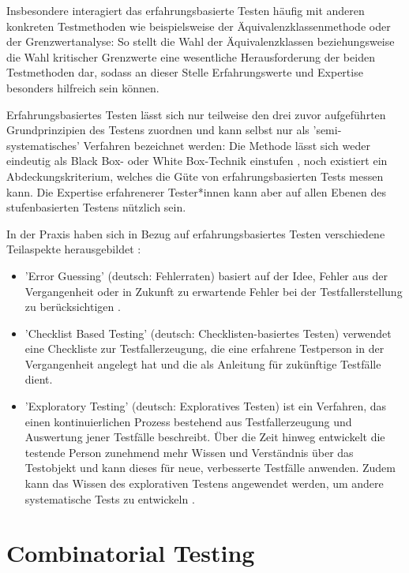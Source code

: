 Insbesondere interagiert das erfahrungsbasierte Testen häufig mit anderen konkreten Testmethoden wie beispielsweise der Äquivalenzklassenmethode oder der Grenzwertanalyse: So stellt die Wahl der Äquivalenzklassen beziehungsweise die Wahl kritischer Grenzwerte eine wesentliche Herausforderung der beiden Testmethoden dar, sodass an dieser Stelle Erfahrungswerte und Expertise besonders hilfreich sein können.

Erfahrungsbasiertes Testen lässt sich nur teilweise den drei zuvor aufgeführten Grundprinzipien des Testens zuordnen und kann selbst nur als 'semi-systematisches' Verfahren bezeichnet werden: Die Methode lässt sich weder eindeutig als Black Box- oder White Box-Technik einstufen \cite[S. 159]{spillner2011software}, noch existiert ein Abdeckungskriterium, welches die Güte von erfahrungsbasierten Tests messen kann. Die Expertise erfahrenerer Tester*innen kann aber auf allen Ebenen des stufenbasierten Testens nützlich sein.

In der Praxis haben sich in Bezug auf erfahrungsbasiertes Testen verschiedene Teilaspekte herausgebildet \cite{}:
\begin{itemize}
\item 'Error Guessing' (deutsch: Fehlerraten) basiert auf der Idee, Fehler aus der Vergangenheit oder in Zukunft zu erwartende Fehler bei der Testfallerstellung zu berücksichtigen \cite[S. 158]{spillner2011software}.
\item 'Checklist Based Testing' (deutsch: Checklisten-basiertes Testen) verwendet eine Checkliste zur Testfallerzeugung, die eine erfahrene Testperson in der Vergangenheit angelegt hat und die als Anleitung für zukünftige Testfälle dient.
\item 'Exploratory Testing' (deutsch: Exploratives Testen) ist ein Verfahren, das einen kontinuierlichen Prozess bestehend aus Testfallerzeugung und Auswertung jener Testfälle beschreibt. Über die Zeit hinweg entwickelt die testende Person zunehmend mehr Wissen und Verständnis über das Testobjekt und kann dieses für neue, verbesserte Testfälle anwenden. Zudem kann das Wissen des explorativen Testens angewendet werden, um andere systematische Tests zu entwickeln \cite[S. 158]{spillner2011software}.
\end{itemize}

\section{Combinatorial Testing}\label{sec:combinatorialTesting}

